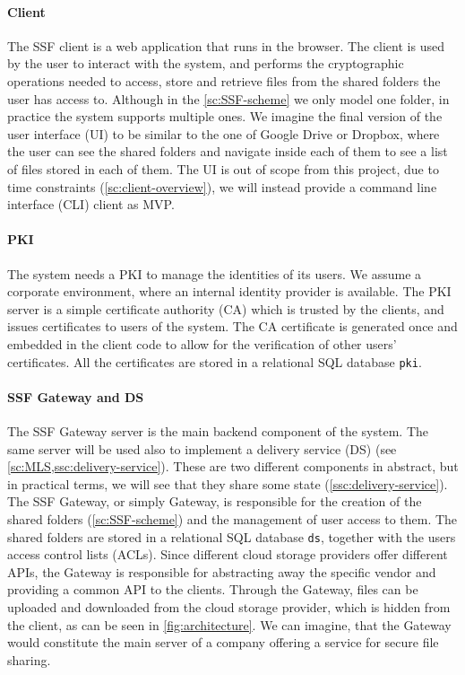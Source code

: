 \paragraph{Client} The SSF client is a web application that
runs in the browser. The client is used by the user to interact with the system, and performs the cryptographic
operations needed to access, store and retrieve files 
from the shared folders the user has access to.
Although in the \cref{sc:SSF-scheme} we only model one folder,
in practice the system supports multiple ones.
We imagine the final version of the user interface (UI) to
be similar to the one of Google Drive or Dropbox, where
the user can see the shared folders and navigate inside each
of them to see a list of files stored in each of them.
The UI is out of scope from this project, due to
time constraints (\cref{sc:client-overview}), we will
instead provide a command line interface (CLI) client
as MVP.

\paragraph{PKI} The system needs a PKI to manage the identities
of its users. We assume a corporate environment, where
an internal identity provider is available. The PKI server
is a simple certificate authority (CA) which is trusted
by the clients, and issues certificates to users of the system.
The CA certificate is generated once and embedded in the client
code to allow for the verification of other users' certificates.
All the certificates are stored in a relational SQL database \texttt{pki}.

\paragraph{SSF Gateway and DS}
The SSF Gateway server is the main backend component of the system.
The same server will be used also to implement a delivery service (DS) (see \cref{sc:MLS,ssc:delivery-service}).
These are two different components in abstract, but in practical terms, 
we will see that they share some state (\cref{ssc:delivery-service}).
The SSF Gateway, or simply Gateway, is responsible for the
creation of the shared folders (\cref{sc:SSF-scheme}) and the management of user access
to them. The shared folders are stored in a relational SQL
database \texttt{ds}, together with the users access control lists (ACLs).
Since different cloud storage providers offer different APIs,
the Gateway is responsible for abstracting away the specific
vendor and providing a common API to the clients.
Through the Gateway, files can be uploaded and downloaded 
from the cloud storage provider, which is hidden from the client,
as can be seen in \cref{fig:architecture}.
We can imagine, that the Gateway would constitute the main
server of a company offering a service for secure file sharing.

